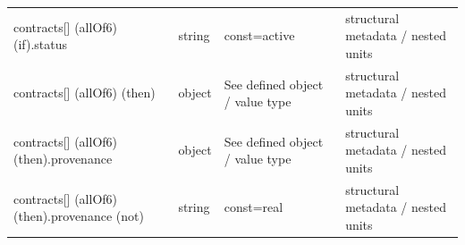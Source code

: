 \begin{longtable}{@{}>{\raggedright\arraybackslash}p{}>{\raggedright\arraybackslash}p{}>{\raggedright\arraybackslash}p{}>{\raggedright\arraybackslash}p{}@{}}
contracts[] (allOf6) (if).\allowbreak{}status & string & const=\allowbreak{}active & structural metadata /\allowbreak{} nested units\\
contracts[] (allOf6) (then) & object & See defined object /\allowbreak{} value type & structural metadata /\allowbreak{} nested units\\
contracts[] (allOf6) (then).\allowbreak{}provenance & object & See defined object /\allowbreak{} value type & structural metadata /\allowbreak{} nested units\\
contracts[] (allOf6) (then).\allowbreak{}provenance (not) & string & const=\allowbreak{}real & structural metadata /\allowbreak{} nested units\\
\end{longtable}\endgroup
